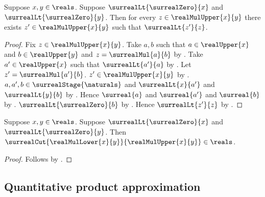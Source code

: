 \begin{proposition}\label{surreal_real_mul_upper_no_minimum}
    Suppose $x,y\in\reals$.
    Suppose $\surrealLt{\surrealZero}{x}$ and
        $\surrealLt{\surrealZero}{y}$.
    Then for every $z\in\realMulUpper{x}{y}$ there exists
        $z'\in\realMulUpper{x}{y}$ such that $\surrealLt{z'}{z}$.
\end{proposition}
\begin{proof}
    Fix $z\in\realMulUpper{x}{y}$.
    Take $a,b$ such that
        $a\in\realUpper{x}$ and $b\in\realUpper{y}$ and
        $z=\surrealMul{a}{b}$
        by .
    Take $a'\in\realUpper{x}$ such that $\surrealLt{a'}{a}$
        by .
    Let $z'=\surrealMul{a'}{b}$.
    $z'\in\realMulUpper{x}{y}$
        by .
    $a,a',b\in\surrealStage{\naturals}$ and
        $\surrealLt{x}{a'}$ and $\surrealLt{y}{b}$
        by .
    Hence $\surreal{a}$ and $\surreal{a'}$ and $\surreal{b}$
        by
        .
    $\surrealLt{\surrealZero}{b}$
        by
        .
    Hence $\surrealLt{z'}{z}$
        by .
\end{proof}

\begin{theorem}\label{surreal_positive_real_mul_cut_is_real}
    Suppose $x,y\in\reals$.
    Suppose $\surrealLt{\surrealZero}{x}$ and
        $\surrealLt{\surrealZero}{y}$.
    Then $\surrealCut{\realMulLower{x}{y}}{\realMulUpper{x}{y}}
        \in\reals$.
\end{theorem}
\begin{proof}
    Follows by
        .
\end{proof}

\subsection{Quantitative product approximation}

